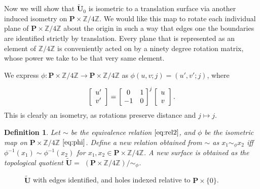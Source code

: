\documentclass[]{article}
\newtheorem{Def}{Definition}[subsection]
\begin{document}
 Now we will show that $\tilde{\mathbf{U}}_0$ is isometric to a translation surface via another induced isometry on $\mathbf{P}\times\mathbb{Z}/4\mathbb{Z}$. We would like this map to rotate each individual plane of $\mathbf{P}\times\mathbb{Z}/4\mathbb{Z}$ about the origin in such a way that edges one the boundaries are identified strictly by translation. Every plane that is represented as an element of $\mathbb{Z}/4\mathbb{Z}$ is conveniently acted on by a ninety degree rotation matrix, whose power we take to be that very same element.


We express $\phi:\mathbf{P}\times\mathbb{Z}/4\mathbb{Z} \rightarrow \mathbf{P}\times\mathbb{Z}/4\mathbb{Z}$ as $\phi(u,v;j) = (u',v';j)$, where

\begin{equation}
	\left[\begin{array}{c}
		u'\\v'
	\end{array}\right] =
		\left[ \hspace{1mm} \begin{matrix}
				0 & 1\\
				-1 & 0
			\end{matrix}\hspace{1mm}\right]^{j}\left[\begin{array}{c}
					u\\v
				\end{array}\right].
\label{eq:phi}
\end{equation}
This is clearly an isometry, as rotations preserve distance and $j\mapsto j$.

\begin{Def} Let $\sim$ be the equivalence relation $\eqref{eq:rel2}$, and $\phi$ be the isometric map on $\mathbf{P}\times\mathbb{Z}/4\mathbb{Z}$ $\eqref{eq:phi}$. Define a new relation obtained from $\sim$ as $x_1\sim_{\phi}x_2$ iff $\phi^{-1}(x_1) \sim \phi^{-1}(x_2)$ for $x_1,x_2\in\mathbf{P}\times\mathbb{Z}/4\mathbb{Z}$. A new surface is obtained as the topological quotient $\tilde{\mathbf{U}}=$ $(\mathbf{P}\times\mathbb{Z}/4\mathbb{Z})/\sim_{\phi}$.\label{eq:simphi}
\end{Def}


\begin{figure}[H]
\centering

\caption{$\tilde{\mathbf{U}}$ with edges identified, and holes indexed relative to $\mathbf{P}\times\{0\}$.}
\label{fig:utilda}
\end{figure}
\end{document}
